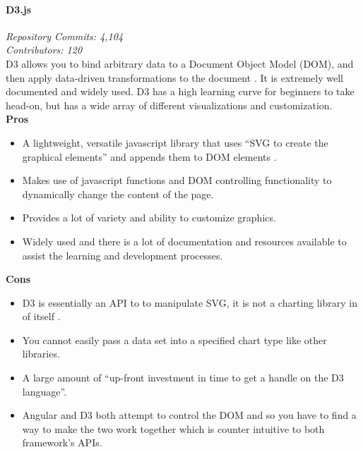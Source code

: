 \paragraph{D3.js}
\textit{Repository Commits: 4,104}\\  
\textit{Contributors: 120}\\
D3 allows you to bind arbitrary data to a Document Object Model (DOM), and then apply data-driven transformations to the document \cite{d3_home}. It is extremely well documented and widely used. D3 has a high learning curve for beginners to take head-on, but has a wide array of different visualizations and customization.\\
\textbf{Pros}
\begin{itemize}
\item A lightweight, versatile javascript library that uses ``SVG to create the graphical elements'' and appends them to DOM elements \cite{Schwartz}. 
\item Makes use of javascript functions and DOM controlling functionality to dynamically change the content of the page. 
\item Provides a lot of variety and ability to customize graphics.
\item Widely used and there is a lot of documentation and resources available to assist the learning and development processes.
\end{itemize}
\textbf{Cons}
\begin{itemize}
\item D3 is essentially an API to to manipulate SVG, it is not a charting library in of itself \cite{Sun}.
\item You cannot easily pass a data set into a specified chart type like other libraries.
\item A large amount of ``up-front investment in time to get a handle on the D3 language''\cite{Jacobson}.
\item Angular and D3 both attempt to control the DOM and so you have to find a way to make the two work together which is counter intuitive to both framework's APIs. 
\end{itemize}
